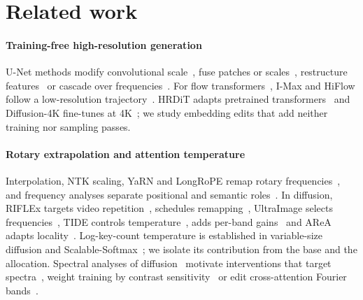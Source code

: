 \section{Related work}\label{sec:related}

\paragraph{Training-free high-resolution generation}
U-Net methods modify convolutional scale~\citep{he2024scalecrafter,huang2024fouriscale}, fuse patches or scales~\citep{du2024demofusion,qiu2024freescale}, restructure features~\citep{zhang2024hidiffusion} or cascade over frequencies~\citep{zhang2025frecas}. For flow transformers~\citep{peebles2023dit,esser2024sd3,flux2024}, I-Max and HiFlow follow a low-resolution trajectory~\citep{du2024imax,bu2025hiflow}. HRDiT adapts pretrained transformers~\citep{hrdit2026} and Diffusion-4K fine-tunes at 4K~\citep{zhang2025diffusion4k}; we study embedding edits that add neither training nor sampling passes.

\paragraph{Rotary extrapolation and attention temperature}
Interpolation, NTK scaling, YaRN and LongRoPE remap rotary frequencies~\citep{chen2023pi,bloc97ntk,peng2024yarn,ding2024longrope}, and frequency analyses separate positional and semantic roles~\citep{barbero2025round,xiong2025dope}. In diffusion, RIFLEx targets video repetition~\citep{zhao2025riflex}, \dype{} schedules remapping~\citep{issachar2025dype}, UltraImage selects frequencies~\citep{ultraimage2025}, TIDE controls temperature~\citep{tide2026}, \sega{} adds per-band gains~\citep{sega2026} and AReA adapts locality~\citep{area2026}. Log-key-count temperature is established in variable-size diffusion and Scalable-Softmax~\citep{jin2023training,nakanishi2025ssmax}; we isolate its contribution from the base and the allocation. Spectral analyses of diffusion~\citep{dieleman2024spectral,falck2025fourier,kadkhodaie2024generalization,graikos2026jacobian} motivate interventions that target spectra~\citep{scg2026}, weight training by contrast sensitivity~\citep{csflow2026} or edit cross-attention Fourier bands~\citep{oh2026afm}.
